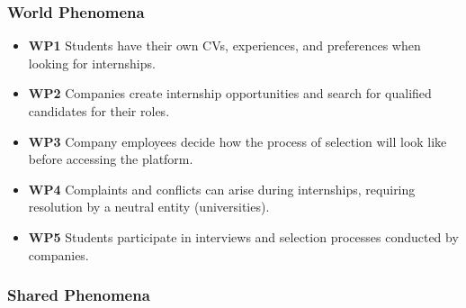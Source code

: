 \subsubsection{World Phenomena}

\begin{itemize}
    \item \textbf{WP1} Students have their own CVs, experiences, and preferences when looking for internships.
    \item \textbf{WP2} Companies create internship opportunities and search for qualified candidates for their roles.
    \item \textbf{WP3} Company employees decide how the process of selection will look like before accessing the platform.
    \item \textbf{WP4} Complaints and conflicts can arise during internships, requiring resolution by a neutral entity (universities).
    \item \textbf{WP5} Students participate in interviews and selection processes conducted by companies.
    
\end{itemize}

\subsubsection{Shared Phenomena}

